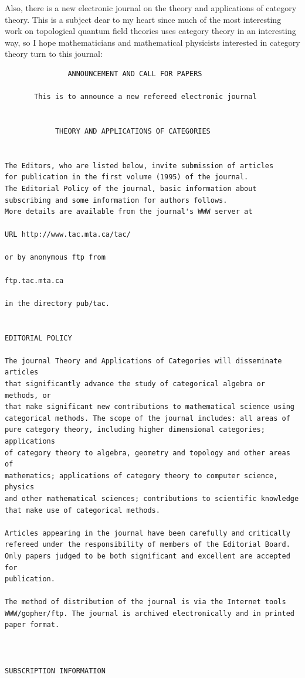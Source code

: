 \documentclass{article}
\begin{document}
Also, there is a new electronic journal on the theory and applications
of category theory. This is a subject dear to my heart since much of the
most interesting work on topological quantum field theories uses
category theory in an interesting way, so I hope mathematicians and
mathematical physicists interested in category theory turn to this
journal:

\begin{verbatim}
               ANNOUNCEMENT AND CALL FOR PAPERS
 
       This is to announce a new refereed electronic journal
 
 
            THEORY AND APPLICATIONS OF CATEGORIES
 
 
The Editors, who are listed below, invite submission of articles 
for publication in the first volume (1995) of the journal.   
The Editorial Policy of the journal, basic information about 
subscribing and some information for authors follows. 
More details are available from the journal's WWW server at
 
URL http://www.tac.mta.ca/tac/
 
or by anonymous ftp from
 
ftp.tac.mta.ca
 
in the directory pub/tac.
 
 
EDITORIAL POLICY
 
The journal Theory and Applications of Categories will disseminate articles 
that significantly advance the study of categorical algebra or methods, or 
that make significant new contributions to mathematical science using 
categorical methods. The scope of the journal includes: all areas of 
pure category theory, including higher dimensional categories; applications 
of category theory to algebra, geometry and topology and other areas of 
mathematics; applications of category theory to computer science, physics 
and other mathematical sciences; contributions to scientific knowledge 
that make use of categorical methods.
 
Articles appearing in the journal have been carefully and critically 
refereed under the responsibility of members of the Editorial Board.
Only papers judged to be both significant and excellent are accepted for 
publication. 
 
The method of distribution of the journal is via the Internet tools 
WWW/gopher/ftp. The journal is archived electronically and in printed 
paper format. 
 
 
 
SUBSCRIPTION INFORMATION
 

\end{verbatim}
\end{document}
